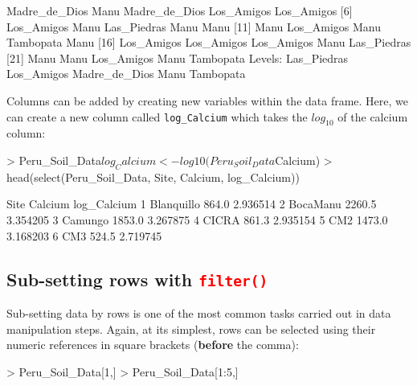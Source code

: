 \documentclass[a4paper,12pt]{article}
\newcommand\code[1]{\textcolor{red}{\texttt{#1}}}
\begin{document}
\begin{shaded}
\begin{Schunk}
\begin{Soutput}
 [1] Madre_de_Dios Manu          Madre_de_Dios Los_Amigos    Los_Amigos   
 [6] Los_Amigos    Manu          Las_Piedras   Manu          Manu         
[11] Manu          Los_Amigos    Manu          Tambopata     Manu         
[16] Los_Amigos    Los_Amigos    Los_Amigos    Manu          Las_Piedras  
[21] Manu          Manu          Los_Amigos    Manu          Tambopata    
Levels: Las_Piedras Los_Amigos Madre_de_Dios Manu Tambopata
\end{Soutput}
\end{Schunk}
\end{shaded}

Columns can be added by creating new variables within the data frame. Here, we can create a new column called \texttt{log\_Calcium} which takes the $log_{10}$ of the calcium column:

\begin{shaded}
\begin{Schunk}
\begin{Sinput}
> Peru_Soil_Data$log_Calcium <- log10(Peru_Soil_Data$Calcium)
> head(select(Peru_Soil_Data, Site, Calcium, log_Calcium))
\end{Sinput}
\begin{Soutput}
        Site Calcium log_Calcium
1 Blanquillo   864.0    2.936514
2   BocaManu  2260.5    3.354205
3    Camungo  1853.0    3.267875
4      CICRA   861.3    2.935154
5        CM2  1473.0    3.168203
6        CM3   524.5    2.719745
\end{Soutput}
\end{Schunk}
\end{shaded}

\subsection{Sub-setting rows with \code{filter()}}

Sub-setting data by rows is one of the most common tasks carried out in data manipulation steps. Again, at its simplest, rows can be selected using their numeric references in square brackets (\textbf{before} the comma):

\begin{shaded}
\begin{Schunk}
\begin{Sinput}
> Peru_Soil_Data[1,]
> Peru_Soil_Data[1:5,]
\end{Sinput}
\end{Schunk}
\end{shaded}
\end{document}
